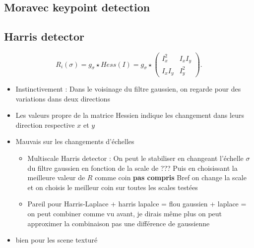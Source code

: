 \documentclass{article}
\theoremstyle{plain}%
\theoremstyle{definition}
\theoremstyle{remark}
\begin{document}
\subsection{Moravec keypoint detection}
\subsection{Harris detector}

\[
    R_i(\sigma ) = g_\sigma \star Hess(I) = g_\sigma \star \begin{pmatrix}
        I_x^2 & I_x I_y \\
        I_x I_y & I_y^2
    \end{pmatrix}
.\]
\begin{itemize}
    \item Instinctivement : Dans le voisinage du filtre gaussien, on regarde pour des variations dans deux directions
    \item Les valeurs propre de la matrice Hessien indique les changement dans leurs direction respective $ x $ et $ y $ 
    \item Mauvais sur les changements d'échelles \begin{itemize}
        \item Multiscale Harris detector : On peut le stabiliser en changeant l'échelle $ \sigma  $ du filtre gaussien en fonction de la scale de ??? Puis en choisissant la meilleure valeur de $ R $ comme coin \textbf{pas compris} Bref on change la scale et on choisis le meilleur coin sur toutes les scales testées
        \item Pareil pour Harris-Laplace + harris lapalce = flou gaussien + laplace = on peut combiner comme vu avant, je dirais même plus on peut approximer la combinaison pas une différence de gaussienne
    \end{itemize}
    \item bien pour les scene texturé
\end{itemize}
\end{document}
